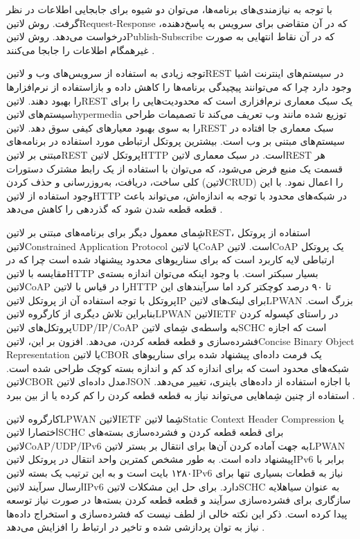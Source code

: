 با توجه به نیازمندی‌های برنامه‌ها، می‌توان دو شیوه برای جابجایی اطلاعات در نظر گرفت. روش ‌لاتین{Request-Response}
که در آن متقاضی برای سرویس به پاسخ‌دهنده، درخواست می‌دهد.
روش ‌لاتین{Publish-Subscribe} که در آن نقاط انتهایی به صورت غیرهمگام اطلاعات را جابجا می‌کنند
.

توجه زیادی به استفاده از سرویس‌های وب و ‌لاتین{REST} در سیستم‌های اینترنت اشیا وجود دارد چرا که
می‌توانند پیچیدگی برنامه‌ها را کاهش داده و بازاستفاده از نرم‌افزارها را بهبود دهند.
‌لاتین{REST} یک سبک معماری نرم‌افزاری است که محدودیت‌هایی را برای سیستم‌های ‌لاتین{hypermedia} توزیع شده مانند وب
تعریف می‌کند تا تصمیمات طراحی را به سوی بهبود معیارهای کیفی سوق دهد.
‌لاتین{REST} سبک معماری جا افتاده در سیستم‌های مبتنی بر وب است.
بیشترین پروتکل ارتباطی مورد استفاده در برنامه‌های مبتنی بر ‌لاتین{REST} پروتکل ‌لاتین{HTTP} است.
در سبک معماری ‌لاتین{REST} هر قسمت یک منبع فرض می‌شود، که می‌توان با استفاده از یک رابط مشترک
دستورات کلی ساخت، دریافت، به‌روزرسانی و حذف کردن (‌لاتین{CRUD}) را اعمال نمود.
با این وجود استفاده از ‌لاتین{HTTP} در شبکه‌های محدود با توجه به اندازه‌اش، می‌تواند
باعث قطعه قطعه شدن شود که گذردهی را کاهش می‌دهد
.

شِمای معمول دیگر برای برنامه‌های مبتنی بر ‌لاتین{REST}، استفاده از پروتکل ‌لاتین{Constrained Application Protocol} یا ‌لاتین{CoAP}
است. ‌لاتین{CoAP} یک پروتکل ارتباطی لایه کاربرد است که برای سناریوهای محدود پیشنهاد شده است چرا که در مقایسه با ‌لاتین{HTTP}
بسیار سبکتر است.
با وجود اینکه می‌توان اندازه بسته‌ی ‌لاتین{CoAP} را در قیاس با ‌لاتین{HTTP} تا ۹۰ درصد کوچکتر کرد اما سرآیندهای این پروتکل با توجه
استفاده آن از پروتکل ‌لاتین{IP} برای لینک‌های ‌لاتین{LPWAN} بزرگ است.
بنابراین تلاش دیگری از کارگروه ‌لاتین{LPWAN} ‌لاتین{IETF} در راستای کپسوله کردن پروتکل‌های ‌لاتین{UDP/IP/CoAP}
به واسطه‌ی شِمای ‌لاتین{SCHC} است که اجازه فشرده‌سازی و قطعه قطعه کردن، می‌دهد.
افزون بر این، ‌لاتین{Concise Binary Object Representation} یا ‌لاتین{CBOR} یک فرمت داده‌ای پیشنهاد شده برای سناریوهای
شبکه‌های محدود است که برای اندازه کد کم و اندازه بسته کوچک طراحی شده است.
‌لاتین{CBOR} مدل داده‌ای ‌لاتین{JSON} با اجازه استفاده از داده‌های باینری، تغییر می‌دهد.
استفاده از چنین شِماهایی می‌تواند نیاز به قطعه قطعه کردن را کم کرده یا از بین ببرد
.

کارگروه ‌لاتین{LPWAN} ‌لاتین{IETF} شِما ‌لاتین{Static Context Header Compression} یا اختصارا ‌لاتین{SCHC}
برای قطعه قطعه کردن و فشرده‌سازی بسته‌های ‌لاتین{CoAP/UDP/IPv6} به جهت آماده کردن آن‌ها برای انتقال بر بستر ‌لاتین{LPWAN}
پیشنهاد داده است. به طور مشخص کمترین واحد انتقال در پروتکل ‌لاتین{IPv6} برابر با ۱۲۸۰ بایت است و به این ترتیب یک بسته ‌لاتین{IPv6}
نیاز به قطعات بسیاری تنها برای ارسال سرآیند ‌لاتین{IPv6} دارد. برای حل این مشکلات ‌لاتین{SCHC} به عنوان ‌سیاه{لایه سازگاری}
برای فشرده‌سازی سرآیند و قطعه قطعه کردن بسته‌ها در صورت نیاز توسعه پیدا کرده است.
ذکر این نکته خالی از لطف نیست که فشرده‌سازی و استخراج داده‌ها نیاز به توان پردازشی شده و تاخیر در ارتباط را افزایش می‌دهد
.

